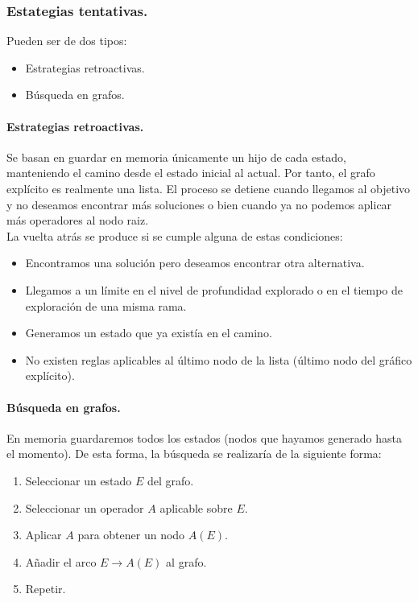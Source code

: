 \documentclass[12pt,spanish]{article}
\numberwithin{definition}{subsection}
\begin{document}
\subsubsection{Estategias tentativas.}

Pueden ser de dos tipos:

\begin{itemize}
	\item Estrategias retroactivas.
	\item Búsqueda en grafos.
\end{itemize}

\paragraph{Estrategias retroactivas.}

Se basan en guardar en memoria únicamente un hijo de cada estado, manteniendo el camino desde el estado inicial al actual. Por tanto, el grafo explícito es realmente una lista. El proceso se detiene cuando llegamos al objetivo y no deseamos encontrar más soluciones o bien cuando ya no podemos aplicar más operadores al nodo raiz.\\

La vuelta atrás se produce si se cumple alguna de estas condiciones:

\begin{itemize}
	\item Encontramos una solución pero deseamos encontrar otra alternativa.
	\item Llegamos a un límite en el nivel de profundidad explorado o en el tiempo de exploración de una misma rama.
	\item Generamos un estado que ya existía en el camino.
	\item No existen reglas aplicables al último nodo de la lista (último nodo del gráfico explícito).
\end{itemize}

\paragraph{Búsqueda en grafos.}

En memoria guardaremos todos los estados (nodos que hayamos generado hasta el momento). De esta forma, la búsqueda se realizaría de la siguiente forma:

\begin{enumerate}
	\item Seleccionar un estado $E$ del grafo.
	\item Seleccionar un operador $A$ aplicable sobre $E$.
	\item Aplicar $A$ para obtener un nodo $A(E)$.
	\item Añadir el arco $E \rightarrow A(E)$ al grafo.
	\item Repetir.
\end{enumerate}
\end{document}
